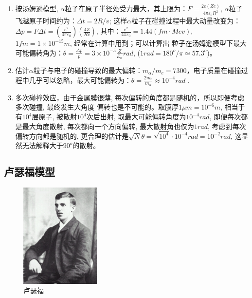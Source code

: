 \begin{enumerate}
\item{按汤姆逊模型, $\alpha
$粒子在原子半径处受力最大，其上限为：$F = \frac{{2e(Ze)}}{{4\pi
\varepsilon _0 R^2 }}$, $\alpha $粒子飞越原子时间约为：$\Delta t =
2R/v$; 这样$\alpha $粒子在碰撞过程中最大动量改变为：$\Delta p =
F\Delta t = \left( {\frac{{e^2 }}{{4\pi \varepsilon _0 }}}
\right)\left( {\frac{{4Z}}{{Rv}}} \right)$, 其中：$\frac{{e^2
}}{{4\pi \varepsilon _0 }} = 1.44(fm \cdot Mev)$, $1fm = 1 \times
10^{ - 15} m$, 经常在计算中用到；可以计算出
粒子在汤姆逊模型下最大可能偏转角为：$\theta  = \frac{{\Delta p}}{p}
= 3 \times 10^{ - 5} \frac{Z}{{E_\alpha }}rad$, ($1 rad = 180^o/ \pi
\simeq 57.3^o$)。}

\item{估计$\alpha $粒子与电子的碰撞导致的最大偏转：$m_\alpha  /m_e
= 7300$，电子质量在碰撞过程中几乎可以忽略，最大可能偏转为：$\theta
= \frac{{2m_e }}{{m_\alpha  }} \approx 10^{ - 4} rad $ .}

\item{多次碰撞效应，由于金属膜很薄, 每次偏转的角度都是随机的，所以即便考虑多次碰撞, 最终发生大角度
偏转也是不可能的。取膜厚$1\mu m = 10^{-6}m$, 相当于有$10^4$层原子,
被散射$10^4$次后出射, 取最大可能偏转角度为$10^{-4}rad$,
即便每次都是最大角度散射, 每次都向一个方向偏转,
最大散射角也仅为$1rad$, 考虑到每次偏转方向都是随机的,
更合理的估计是$\sqrt N \theta = \sqrt{10^4} \cdot 10^{-4} rad  =
10^{-2} rad$, 这显然无法解释大于$90^o$的散射。}

\end{enumerate}


\subsection{卢瑟福模型}

\begin{figure}[h]
\begin{center}
\includegraphics[clip,width=4cm]{AtomIdea/rutherford.ps}
\caption{卢瑟福}
\end{center}
\end{figure}

